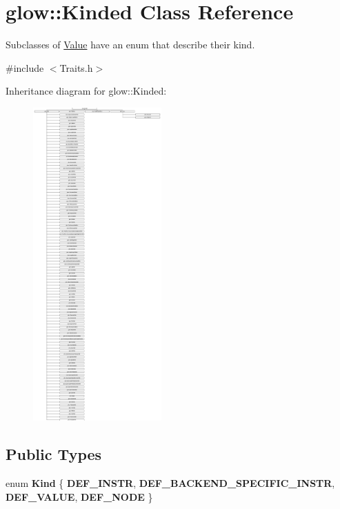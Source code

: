 \hypertarget{classglow_1_1_kinded}{}\section{glow\+:\+:Kinded Class Reference}
\label{classglow_1_1_kinded}


Subclasses of \hyperlink{classglow_1_1_value}{Value} have an enum that describe their kind.  




{\ttfamily \#include $<$Traits.\+h$>$}

Inheritance diagram for glow\+:\+:Kinded\+:\begin{figure}[H]
\begin{center}
\leavevmode
\includegraphics[height=12.000000cm]{classglow_1_1_kinded}
\end{center}
\end{figure}
\subsection*{Public Types}
\begin{DoxyCompactItemize}
\item 
\mbox{\label{classglow_1_1_kinded_ac1213e4fa518bbe8f4cf0729eaf1162f}} 
enum {\bfseries Kind} \{ {\bfseries D\+E\+F\+\_\+\+I\+N\+S\+TR}, 
{\bfseries D\+E\+F\+\_\+\+B\+A\+C\+K\+E\+N\+D\+\_\+\+S\+P\+E\+C\+I\+F\+I\+C\+\_\+\+I\+N\+S\+TR}, 
{\bfseries D\+E\+F\+\_\+\+V\+A\+L\+UE}, 
{\bfseries D\+E\+F\+\_\+\+N\+O\+DE}
 \}
\end{DoxyCompactItemize}
